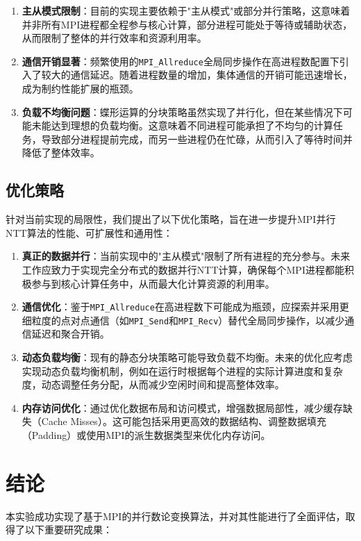 \documentclass[a4paper]{article}
\begin{document}
\begin{enumerate}
  \item \textbf{主从模式限制}：目前的实现主要依赖于"主从模式"或部分并行策略，这意味着并非所有MPI进程都全程参与核心计算，部分进程可能处于等待或辅助状态，从而限制了整体的并行效率和资源利用率。
  \item \textbf{通信开销显著}：频繁使用的\texttt{MPI\_Allreduce}全局同步操作在高进程数配置下引入了较大的通信延迟。随着进程数量的增加，集体通信的开销可能迅速增长，成为制约性能扩展的瓶颈。
  \item \textbf{负载不均衡问题}：蝶形运算的分块策略虽然实现了并行化，但在某些情况下可能未能达到理想的负载均衡。这意味着不同进程可能承担了不均匀的计算任务，导致部分进程提前完成，而另一些进程仍在忙碌，从而引入了等待时间并降低了整体效率。
\end{enumerate}

\subsection{优化策略}

针对当前实现的局限性，我们提出了以下优化策略，旨在进一步提升MPI并行NTT算法的性能、可扩展性和通用性：

\begin{enumerate}
  \item \textbf{真正的数据并行}：当前实现中的"主从模式"限制了所有进程的充分参与。未来工作应致力于实现完全分布式的数据并行NTT计算，确保每个MPI进程都能积极参与到核心计算任务中，从而最大化计算资源的利用率。
  \item \textbf{通信优化}：鉴于\texttt{MPI\_Allreduce}在高进程数下可能成为瓶颈，应探索并采用更细粒度的点对点通信（如\texttt{MPI\_Send}和\texttt{MPI\_Recv}）替代全局同步操作，以减少通信延迟和聚合开销。
  \item \textbf{动态负载均衡}：现有的静态分块策略可能导致负载不均衡。未来的优化应考虑实现动态负载均衡机制，例如在运行时根据每个进程的实际计算进度和复杂度，动态调整任务分配，从而减少空闲时间和提高整体效率。
  \item \textbf{内存访问优化}：通过优化数据布局和访问模式，增强数据局部性，减少缓存缺失（Cache Misses）。这可能包括采用更高效的数据结构、调整数据填充（Padding）或使用MPI的派生数据类型来优化内存访问。
\end{enumerate}

\section{结论}

本实验成功实现了基于MPI的并行数论变换算法，并对其性能进行了全面评估，取得了以下重要研究成果：
\end{document}
